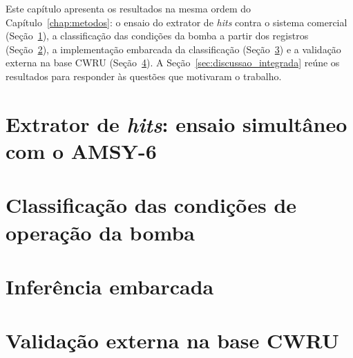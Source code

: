 
Este capítulo apresenta os resultados na mesma ordem do Capítulo~\ref{chap:metodos}: o ensaio do extrator de \textit{hits} contra o sistema comercial (Seção~\ref{sec:res_extrator}), a classificação das condições da bomba a partir dos registros (Seção~\ref{sec:res_bomba}), a implementação embarcada da classificação (Seção~\ref{sec:res_embarcado}) e a validação externa na base CWRU (Seção~\ref{sec:res_cwru}). A Seção~\ref{sec:discussao_integrada} reúne os resultados para responder às questões que motivaram o trabalho.

\section{Extrator de \textit{hits}: ensaio simultâneo com o AMSY-6}
\label{sec:res_extrator}


\section{Classificação das condições de operação da bomba}
\label{sec:res_bomba}


\section{Inferência embarcada}
\label{sec:res_embarcado}


\section{Validação externa na base CWRU}
\label{sec:res_cwru}


